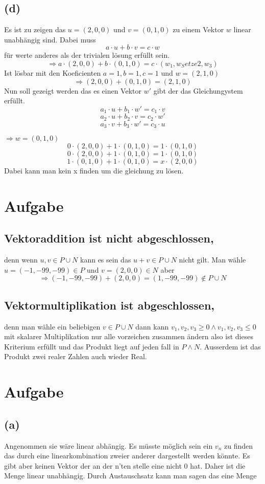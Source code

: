 \documentclass{article}
\begin{document}
\subsection*{(d)}
Es ist zu zeigen das \(u = (2, 0, 0)\) und \(v = (0, 1, 0)\) zu einem Vektor \(w\) linear unabhängig sind. Dabei muss
\[a \cdot u + b \cdot v = c \cdot w\]
für werte anderes als der trivialen lösung erfüllt sein.
\[ \Rightarrow a \cdot (2,0,0) + b \cdot (0,1,0) = c \cdot (w_1, w_Setze2, w_3)\]
Ist lösbar mit den Koeficienten \(a = 1, b = 1, c = 1\) und \(w = (2, 1, 0)\)
\[ \Rightarrow  (2,0,0) + (0,1,0) = (2, 1, 0)\]
Nun soll gezeigt werden das es einen Vektor \(w'\) gibt der das Gleichungystem erfüllt.
\[a_1 \cdot u + b_1 \cdot w' = c_1 \cdot v\]
\[a_2 \cdot u + b_2 \cdot v = c_2 \cdot w'\]
\[a_3 \cdot v + b_3 \cdot w' = c_3 \cdot u\]

\(\Rightarrow w = (0, 1, 0)\)
\[0 \cdot (2,0,0) + 1 \cdot (0,1,0) = 1 \cdot (0,1,0)\]
\[0 \cdot (2,0,0) + 1 \cdot (0,1,0) = 1 \cdot (0, 1,0)\]
\[1 \cdot (0,1,0) + 1 \cdot (0,1,0) = x \cdot (2,0,0) 
\]
Dabei kann man kein x finden um die gleichung zu lösen.

\section{Aufgabe}
\subsection*{Vektoraddition ist nicht abgeschlossen, }
denn wenn \(u,v \in P \cup N\) kann es sein das \(u + v \in P \cup N\) nicht gilt. Man wähle \(u = (-1, -99, -99) \in P\) und \(v = (2, 0, 0) \in N\)
aber 
\[\Rightarrow (-1, -99, -99) + (2, 0, 0) = (1,-99, -99)\not \in P\cup N\]
\subsection*{Vektormultiplikation ist abgeschlossen,}denn man wähle ein beliebigen \(v \in P \cup N\) dann kann \(v_1, v_2, v_3 \geq 0 \wedge v_1, v_2, v_3 \leq 0\) mit skalarer Multiplikation nur alle vorzeichen zusammen ändern also ist dieses Kriterium erfüllt und das Produkt liegt auf jeden fall in \(P \wedge N\). Ausserdem ist das Produkt zwei realer Zahlen auch wieder Real. 

\section{Aufgabe}
\subsection*{(a)}
Angenommen sie wäre linear abhängig. Es müsste möglich sein ein \(v_n\) zu finden das durch eine linearkombination zweier anderer dargestellt werden könnte. Es gibt aber keinen Vektor der an der n'ten stelle eine nicht 0 hat. Daher ist die Menge linear unabhängig. 
Durch Austauschsatz kann man sagen das eine Menge  
\end{document}
